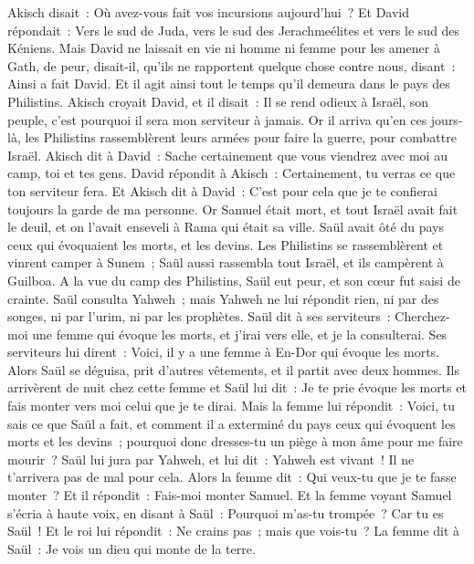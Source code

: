\begin{multicols}{2}
Akisch disait~: Où avez-vous fait vos incursions aujourd'hui~? Et David répondait~: Vers le sud de Juda, vers le sud des Jerachmeélites et vers le sud des Kéniens.
Mais David ne laissait en vie ni homme ni femme pour les amener à Gath, de peur, disait-il, qu'ils ne rapportent quelque chose contre nous, disant~: Ainsi a fait David. Et il agit ainsi tout le temps qu'il demeura dans le pays des Philistins.
Akisch croyait David, et il disait~: Il se rend odieux à Israël, son peuple, c'est pourquoi il sera mon serviteur à jamais.
\VerseOne{}Or il arriva qu'en ces jours-là, les Philistins rassemblèrent leurs armées pour faire la guerre, pour combattre Israël. Akisch dit à David~: Sache certainement que vous viendrez avec moi au camp, toi et tes gens.
David répondit à Akisch~: Certainement, tu verras ce que ton serviteur fera. Et Akisch dit à David~: C'est pour cela que je te confierai toujours la garde de ma personne.
Or Samuel était mort, et tout Israël avait fait le deuil, et on l'avait enseveli à Rama qui était sa ville. Saül avait ôté du pays ceux qui évoquaient les morts, et les devins.
Les Philistins se rassemblèrent et vinrent camper à Sunem~; Saül aussi rassembla tout Israël, et ils campèrent à Guilboa.
A la vue du camp des Philistins, Saül eut peur, et son cœur fut saisi de crainte.
Saül consulta Yahweh~; mais Yahweh ne lui répondit rien, ni par des songes, ni par l'urim, ni par les prophètes.
Saül dit à ses serviteurs~: Cherchez-moi une femme qui évoque les morts, et j'irai vers elle, et je la consulterai. Ses serviteurs lui dirent~: Voici, il y a une femme à En-Dor qui évoque les morts.
Alors Saül se déguisa, prit d'autres vêtements, et il partit avec deux hommes. Ils arrivèrent de nuit chez cette femme et Saül lui dit~: Je te prie évoque les morts et fais monter vers moi celui que je te dirai.
Mais la femme lui répondit~: Voici, tu sais ce que Saül a fait, et comment il a exterminé du pays ceux qui évoquent les morts et les devins~; pourquoi donc dresses-tu un piège à mon âme pour me faire mourir~?
Saül lui jura par Yahweh, et lui dit~: Yahweh est vivant~! Il ne t'arrivera pas de mal pour cela.
Alors la femme dit~: Qui veux-tu que je te fasse monter~? Et il répondit~: Fais-moi monter Samuel.
Et la femme voyant Samuel s'écria à haute voix, en disant à Saül~: Pourquoi m'as-tu trompée~? Car tu es Saül~!
Et le roi lui répondit~: Ne crains pas~; mais que vois-tu~? La femme dit à Saül~: Je vois un dieu qui monte de la terre.

\end{multicols}
